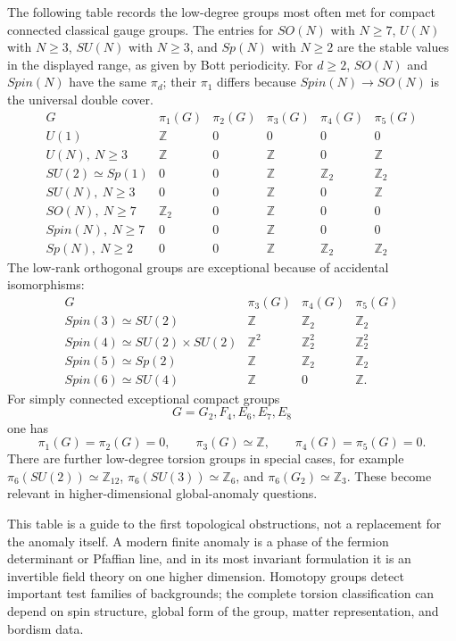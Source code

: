The following table records the low-degree groups most often met for compact
connected classical gauge groups.  The entries for \(SO(N)\) with \(N\ge7\),
\(U(N)\) with \(N\ge3\), \(SU(N)\) with \(N\ge3\), and \(Sp(N)\) with \(N\ge2\)
are the stable values in the displayed range, as given by Bott periodicity.
For \(d\ge2\), \(SO(N)\) and \(Spin(N)\) have the same \(\pi_d\); their
\(\pi_1\) differs because \(Spin(N)\to SO(N)\) is the universal double cover.
\[
\begin{array}{c|ccccc}
G & \pi_1(G) & \pi_2(G) & \pi_3(G) & \pi_4(G) & \pi_5(G) \\
\hline
U(1) & \mathbb Z & 0 & 0 & 0 & 0 \\
U(N),\ N\ge3 & \mathbb Z & 0 & \mathbb Z & 0 & \mathbb Z \\
SU(2)\simeq Sp(1) & 0 & 0 & \mathbb Z & \mathbb Z_2 & \mathbb Z_2 \\
SU(N),\ N\ge3 & 0 & 0 & \mathbb Z & 0 & \mathbb Z \\
SO(N),\ N\ge7 & \mathbb Z_2 & 0 & \mathbb Z & 0 & 0 \\
Spin(N),\ N\ge7 & 0 & 0 & \mathbb Z & 0 & 0 \\
Sp(N),\ N\ge2 & 0 & 0 & \mathbb Z & \mathbb Z_2 & \mathbb Z_2
\end{array}
\]
The low-rank orthogonal groups are exceptional because of accidental
isomorphisms:
\[
\begin{array}{c|ccc}
G & \pi_3(G) & \pi_4(G) & \pi_5(G) \\
\hline
Spin(3)\simeq SU(2) & \mathbb Z & \mathbb Z_2 & \mathbb Z_2 \\
Spin(4)\simeq SU(2)\times SU(2)
  & \mathbb Z^2 & \mathbb Z_2^2 & \mathbb Z_2^2 \\
Spin(5)\simeq Sp(2) & \mathbb Z & \mathbb Z_2 & \mathbb Z_2 \\
Spin(6)\simeq SU(4) & \mathbb Z & 0 & \mathbb Z .
\end{array}
\]
For simply connected exceptional compact groups
\[
  G=G_2,F_4,E_6,E_7,E_8
\]
one has
\[
  \pi_1(G)=\pi_2(G)=0,\qquad
  \pi_3(G)\simeq\mathbb Z,\qquad
  \pi_4(G)=\pi_5(G)=0 .
\]
There are further low-degree torsion groups in special cases, for example
\(\pi_6(SU(2))\simeq\mathbb Z_{12}\),
\(\pi_6(SU(3))\simeq\mathbb Z_6\), and
\(\pi_6(G_2)\simeq\mathbb Z_3\).  These become relevant in higher-dimensional
global-anomaly questions.

This table is a guide to the first topological obstructions, not a replacement
for the anomaly itself.  A modern finite anomaly is a phase of the fermion
determinant or Pfaffian line, and in its most invariant formulation it is an
invertible field theory on one higher dimension.  Homotopy groups detect
important test families of backgrounds; the complete torsion classification can
depend on spin structure, global form of the group, matter representation, and
bordism data.

